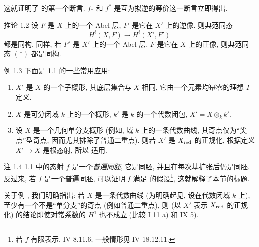 这就证明了
的第一个断言. $f_{\ast}$ 和 $f^{\ast}$ 是互为拟逆的等价这一断言立即得出.

\begin{enonce*}{推论 1.2}
设 $F$ 是 $X$ 上的一个 Abel 层, $F'$ 是它在 $X'$ 上的逆像.
则典范同态
\begin{equation*}
H^{i} (X, F) \to H^{i} (X', F')\tag{$\ast$}
\end{equation*}
都是同构. 同样, 若 $F'$ 是 $X'$ 上的一个 Abel 层,
$F$ 是它在 $X$ 上的正像, 则典范同态 $(\ast)$ 都是同构.
\end{enonce*}

\begin{enonce*}[remark]{例 1.3}
下面\pageoriginale 是 \hyperref[VIII.thm1.1]{1.1} 的一些常用应用:
\begin{enumerate}
\renewcommand{\theenumi}{\alph{enumi}}
\renewcommand{\labelenumi}{\theenumi)}
\item $X'$ 是 $X$ 的一个子概形, 其底层集合与 $X$ 相同,
\ie 它由一个元素均幂零的理想 $I$ 定义.

\item $X$ 是可分闭域 $k$ 上的一个概形,
$k'$ 是 $k$ 的一个代数闭包, $X'=X\otimes_k k'$.

\item 设 $X$ 是一个几何单分支概形
(例如, 域 $k$ 上的一条代数曲线,
其奇点仅为“尖点”型奇点, 因而尤其排除了普通二重点).
则若 $X'$ 是 $X_{\operatorname{red}}$ 的正规化, 根据定义 $X'\to X$ 是根态射,
所以  适用.
\end{enumerate}
\end{enonce*}

\begin{enonce*}[remark]{注 1.4}
\hyperref[VIII.thm1.1]{1.1} 中的态射 $f$ 是一个\emph{普遍同胚},
\ie 它是同胚, 并且在每次基扩张后仍是同胚.
反过来, 若 $f$ 是一个普遍同胚,
可以证明 $f$ 满足
的假设\footnote{若 $f$ 有限表示, \Cf \EGA IV 8.11.6;
一般情形见 \EGA IV 18.12.11.}, 这就解释了本节的标题.

关于例 ,
我们明确指出: 若 $X$ 是一条代数曲线
(为明确起见, 设在代数闭域 $k$ 上),
至少有一个不是“单分支”的奇点 (例如普通二重点),
则 (以 $X'$ 表示 $X_{\operatorname{red}}$ 的正规化)
的结论即使对常系数的 $H^1$ 也不成立
(比较  I 11 a) 和  IX 5).
\end{enonce*}

